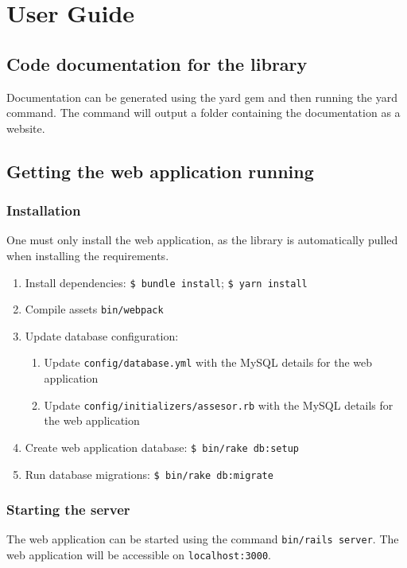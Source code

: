 \chapter{User Guide}

\section{Code documentation for the library}

Documentation can be generated using the yard gem and then running the yard command. The command will output a  folder containing the documentation as a website.

\section{Getting the web application running}
\subsection{Installation}
One must only install the web application, as the library is automatically pulled when installing the requirements.

\begin{enumerate}
    \item Install dependencies: \texttt{\$ bundle install}; \texttt{\$ yarn install}
    \item Compile assets \texttt{bin/webpack}
    \item Update database configuration:
    \begin{enumerate}
        \item Update \texttt{config/database.yml} with the MySQL details for the web application
        \item Update \texttt{config/initializers/assesor.rb} with the MySQL details for the web application
    \end{enumerate}
    \item Create web application database: \texttt{\$ bin/rake db:setup}
    \item Run database migrations: \texttt{\$ bin/rake db:migrate}
\end{enumerate}

\subsection{Starting the server}

The web application can be started using the command \texttt{bin/rails server}. The web application will be accessible on \texttt{localhost:3000}.

